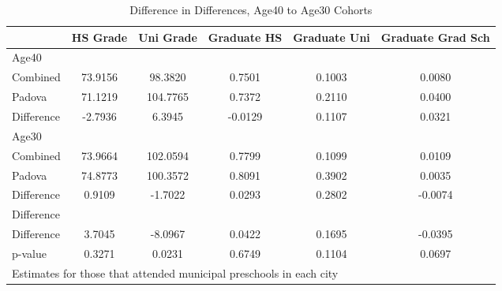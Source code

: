 \begin{table}[htbp]\centering
\caption{Difference in Differences, Age40 to Age30 Cohorts}
\begin{tabular}{l*{5}{c}}
\hline\hline
            &    HS Grade&   Uni Grade& Graduate HS&Graduate Uni&Graduate Grad Sch\\
\hline
Age40       &            &            &            &            &            \\
Combined    &     73.9156&     98.3820&      0.7501&      0.1003&      0.0080\\
Padova      &     71.1219&    104.7765&      0.7372&      0.2110&      0.0400\\
Difference  &     -2.7936&      6.3945&     -0.0129&      0.1107&      0.0321\\
\hline
Age30       &            &            &            &            &            \\
Combined    &     73.9664&    102.0594&      0.7799&      0.1099&      0.0109\\
Padova      &     74.8773&    100.3572&      0.8091&      0.3902&      0.0035\\
Difference  &      0.9109&     -1.7022&      0.0293&      0.2802&     -0.0074\\
\hline
Difference  &            &            &            &            &            \\
Difference  &      3.7045&     -8.0967&      0.0422&      0.1695&     -0.0395\\
p-value     &      0.3271&      0.0231&      0.6749&      0.1104&      0.0697\\
\hline\hline
\multicolumn{6}{l}{\footnotesize Estimates for those that attended municipal preschools in each city}\\
\end{tabular}
\end{table}
